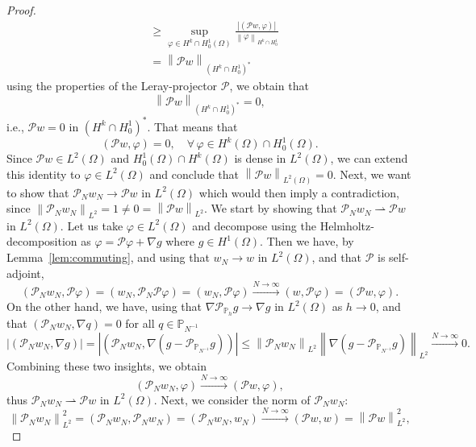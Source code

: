 \documentclass[10pt,letterpaper]{amsart}
\newcommand\norm[1]{\left\lVert#1\right\rVert}
\newcommand{\Grad}{\nabla}
\newcommand{\dom}{\Omega}
\newcommand{\Ph}{\mathbb{P}_h}
\newcommand{\weak}{\rightharpoonup}
\newcommand{\PPh}{\mathcal{P}_{\Ph}}
\newcommand{\PN}{\mathcal{P}_{N}}
\newcommand{\Pl}{\mathcal{P}} %
\theoremstyle{definition}{\newtheorem{definition}[lemma]{Definition}}
\numberwithin{equation}{section}
\begin{document}
\begin{proof}
\begin{equation*}
\begin{split}
			&\geq \sup_{\varphi \in H^k\cap H^1_{0}(\dom)} \frac{|(\Pl w,\varphi)|}{\norm{ \varphi}_{H^k\cap H^1_0}} \\
			&= \norm{\Pl w}_{(H^k\cap H^1_0)^*}
		\end{split}
	\end{equation*}
	using the properties of the Leray-projector $\Pl$, we obtain that
	\begin{equation*}
		\norm{\Pl w}_{(H^k\cap H^1_0)^*}=0, 
	\end{equation*}
	i.e., $\Pl w =0$ in $(H^k\cap H^1_0)^*$. That means that
	\begin{equation*}
		(\Pl w,\varphi) =0,\quad \forall \, \varphi\in H^k(\dom)\cap H^1_0(\dom).
	\end{equation*}
	Since $\Pl w\in L^2(\dom)$ and $H^1_0(\dom)\cap H^k(\dom)$ is dense in $L^2(\dom)$, we can extend this identity to $\varphi \in L^2(\dom)$ and conclude that $\norm{\Pl w}_{L^2(\dom)} = 0$. Next, we want to show that $\PN w_N\to \Pl w$ in $L^2(\dom)$ which would then imply a contradiction, since $\norm{\PN w_N}_{L^2}=1\neq 0=\norm{\Pl w}_{L^2}$. We start by showing that $\PN w_N \weak \Pl w$ in $L^2(\dom)$. Let us take $\varphi\in L^2(\dom)$ and decompose using the Helmholtz-decomposition as
	$\varphi =\Pl \varphi + \Grad g$ where $g\in H^1(\dom)$. Then we have, by Lemma~\ref{lem:commuting}, and using that $w_N\to w$ in $L^2(\dom)$, and that $\Pl$ is self-adjoint,
	\begin{equation*}
		(\PN w_N, \Pl \varphi ) = (w_N,\PN \Pl \varphi) = (w_N,\Pl \varphi) \stackrel{N\to \infty}{\longrightarrow} (w,\Pl\varphi) = (\Pl w,\varphi).
	\end{equation*}
	On the other hand, we have, using that $\Grad \PPh g \to \Grad g$ in $L^2(\dom)$ as $h\to 0$, and that $(\PN w_N,\Grad q) = 0$ for all $q\in \mathbb{P}_{N^{-1}}$
	\begin{equation*}
		|	(\PN w_N,\Grad g)| =| (\PN w_N,\Grad (g- \mathcal{P}_{\mathbb{P}_{N^{-1}}}g))| \leq \norm{\PN w_N}_{L^2}\norm{\Grad (g- \mathcal{P}_{\mathbb{P}_{N^{-1}}}g)}_{L^2} \stackrel{N\to \infty}{\longrightarrow} 0.
	\end{equation*}
	Combining these two insights, we obtain
	\begin{equation*}
		(\PN w_N,\varphi)\stackrel{N\to \infty}{\longrightarrow} (\Pl w,\varphi),
	\end{equation*}
	thus $\PN w_N\weak \Pl w$ in $L^2(\dom)$. Next, we consider the norm of $\PN w_N$:
	\begin{equation*}
		\norm{\PN w_N}_{L^2}^2 = (\PN w_N,\PN w_N) = (\PN w_N,w_N) \stackrel{N\to \infty}{\longrightarrow} (\Pl w,w) = \norm{\Pl w}_{L^2}^2,

\end{equation*}
\end{proof}
\end{document}
